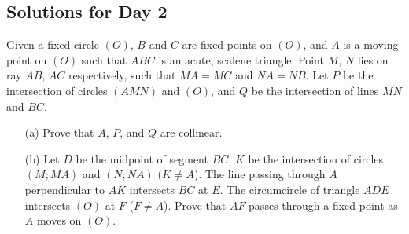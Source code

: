 \documentclass[11pt]{article}
\begin{document}
    \newpage

    \subsection{Solutions for Day 2}

        \begin{problem}
            Given a fixed circle \((O)\), \(B\) and \(C\) are fixed points on \((O)\), and \(A\) is a moving point on \((O)\) such that \(ABC\) is an acute, scalene triangle. Point \(M\), \(N\) lies on ray \(AB\), \(AC\) respectively, such that \(MA = MC\) and \(NA = NB\). Let \(P\) be the intersection of circles \((AMN)\) and \((O)\), and \(Q\) be the intersection of lines \(MN\) and \(BC\).
            \begin{enumerate}
                \item[(a)] Prove that \(A\), \(P\), and \(Q\) are collinear.
                \item[(b)] Let \(D\) be the midpoint of segment \(BC\), \(K\) be the intersection of circles \((M;MA)\) and \((N;NA)\) (\(K \neq A\)). The line passing through \(A\) perpendicular to \(AK\) intersects \(BC\) at \(E\). The circumcircle of triangle \(ADE\) intersects \((O)\) at \(F\) (\(F \neq A\)). Prove that \(AF\) passes through a fixed point as \(A\) moves on \((O)\).
            \end{enumerate}
        \end{problem}
\end{document}
